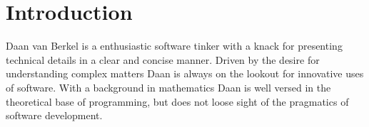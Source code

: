 \section*{Introduction}


Daan van Berkel is a enthusiastic software tinker with a knack for
presenting technical details in a clear and concise manner. Driven by the desire
for understanding complex matters Daan is always on the lookout for innovative
uses of software.
With a background in mathematics Daan is well versed in the theoretical base of
programming, but does not loose sight of the pragmatics of software development.
